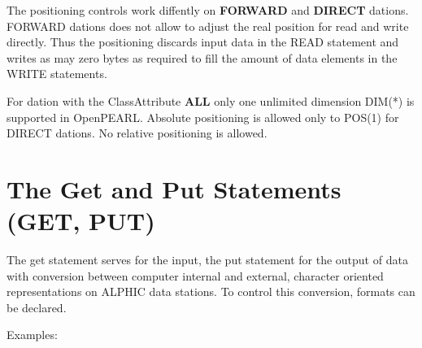 \begin{accepted}
The positioning controls work diffently on {\bf FORWARD} and {\bf DIRECT}
dations. FORWARD dations does not allow to adjust the real position for read
and write directly. 
Thus the positioning discards input data in the READ statement and 
writes as may zero bytes as required to fill the amount of data elements
in the WRITE statements.
\end{accepted}

\begin{accepted}
For dation with the ClassAttribute {\bf ALL} only one unlimited dimension
DIM(*) is supported in OpenPEARL.
Absolute positioning is allowed only to POS(1) for DIRECT dations.
No relative positioning is allowed.
\end{accepted}

\section{The Get and Put Statements (GET, PUT)}    %
\label{sec_get_put}

The get statement serves for the input, the put statement for the
output of data with conversion between computer internal and external,
character oriented representations on ALPHIC data stations. To control
this conversion, formats can be declared.

Examples:

